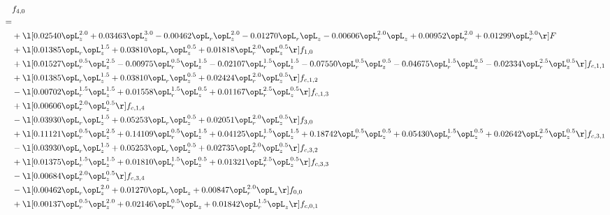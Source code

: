 \begin{alignat}{2} 
\label{eq:f_40_1} 
& f_{4,0} \nonumber \\ 
 = \\ 
& + \l[  0.02540 \opL_z^{2.0} +  0.03463 \opL_z^{3.0}   -0.00462 \opL_r \opL_z^{2.0}   -0.01270 \opL_r \opL_z   -0.00606 \opL_r^{2.0} \opL_z +  0.00952 \opL_r^{2.0} +  0.01299 \opL_r^{3.0}  \r] F \nonumber \\ 
& + \l[  0.01385 \opL_r \opL_z^{1.5} +  0.03810 \opL_r \opL_z^{0.5} +  0.01818 \opL_r^{2.0} \opL_z^{0.5}  \r] f_{1,0} \nonumber \\ 
& + \l[  0.01527 \opL_r^{0.5} \opL_z^{2.5}   -0.00975 \opL_r^{0.5} \opL_z^{1.5}   -0.02107 \opL_r^{1.5} \opL_z^{1.5}   -0.07550 \opL_r^{0.5} \opL_z^{0.5}   -0.04675 \opL_r^{1.5} \opL_z^{0.5}   -0.02334 \opL_r^{2.5} \opL_z^{0.5}  \r] f_{c,1,1} \nonumber \\ 
& + \l[  0.01385 \opL_r \opL_z^{1.5} +  0.03810 \opL_r \opL_z^{0.5} +  0.02424 \opL_r^{2.0} \opL_z^{0.5}  \r] f_{c,1,2} \nonumber \\ 
& - \l[  0.00702 \opL_r^{1.5} \opL_z^{1.5} +  0.01558 \opL_r^{1.5} \opL_z^{0.5} +  0.01167 \opL_r^{2.5} \opL_z^{0.5}  \r] f_{c,1,3} \nonumber \\ 
& + \l[  0.00606 \opL_r^{2.0} \opL_z^{0.5}  \r] f_{c,1,4} \nonumber \\ 
& - \l[  0.03930 \opL_r \opL_z^{1.5} +  0.05253 \opL_r \opL_z^{0.5} +  0.02051 \opL_r^{2.0} \opL_z^{0.5}  \r] f_{3,0} \nonumber \\ 
& + \l[  0.11121 \opL_r^{0.5} \opL_z^{2.5} +  0.14109 \opL_r^{0.5} \opL_z^{1.5} +  0.04125 \opL_r^{1.5} \opL_z^{1.5} +  0.18742 \opL_r^{0.5} \opL_z^{0.5} +  0.05430 \opL_r^{1.5} \opL_z^{0.5} +  0.02642 \opL_r^{2.5} \opL_z^{0.5}  \r] f_{c,3,1} \nonumber \\ 
& - \l[  0.03930 \opL_r \opL_z^{1.5} +  0.05253 \opL_r \opL_z^{0.5} +  0.02735 \opL_r^{2.0} \opL_z^{0.5}  \r] f_{c,3,2} \nonumber \\ 
& + \l[  0.01375 \opL_r^{1.5} \opL_z^{1.5} +  0.01810 \opL_r^{1.5} \opL_z^{0.5} +  0.01321 \opL_r^{2.5} \opL_z^{0.5}  \r] f_{c,3,3} \nonumber \\ 
& - \l[  0.00684 \opL_r^{2.0} \opL_z^{0.5}  \r] f_{c,3,4} \nonumber \\ 
& - \l[  0.00462 \opL_r \opL_z^{2.0} +  0.01270 \opL_r \opL_z +  0.00847 \opL_r^{2.0} \opL_z  \r] f_{0,0} \nonumber \\ 
& + \l[  0.00137 \opL_r^{0.5} \opL_z^{2.0} +  0.02146 \opL_r^{0.5} \opL_z +  0.01842 \opL_r^{1.5} \opL_z  \r] f_{c,0,1} \nonumber \\ 

\end{alignat}
